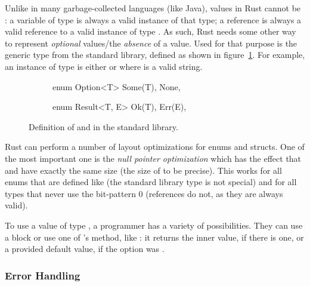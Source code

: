 Unlike in many garbage-collected languages (like Java), values in Rust cannot be :
a variable of type  is always a valid instance of that type; a reference  is always a valid reference to a valid instance of type .
As such, Rust needs some other way to represent \emph{optional} values/the \emph{absence} of a value.
Used for that purpose is the generic type  from the standard library, defined as shown in figure~\ref{fig:option-result-def}.
For example, an instance of type  is either  or  where  is a valid string.

\begin{figure}[b]
\centering
\begin{subfigure}{.4\textwidth}
\begin{rustcode}
enum Option<T> {
    Some(T),
    None,
}
\end{rustcode}
\end{subfigure}
\begin{subfigure}{.4\textwidth}
\begin{rustcode}
enum Result<T, E> {
    Ok(T),
    Err(E),
}
\end{rustcode}
\end{subfigure}
\caption{Definition of  and  in the standard library.}
\label{fig:option-result-def}
\end{figure}

Rust can perform a number of layout optimizations for enums and structs. One of the most important one is the \emph{null pointer optimization} which has the effect that  and  have exactly the same size (the size of  to be precise). This works for all enums that are defined like  (the standard library type is not special) and for all types that never use the bit-pattern 0 (references do not, as they are always valid).

To use a value of type , a programmer has a variety of possibilities. They can use a  block or use one of 's method, like : it returns the inner value, if there is one, or a provided default value, if the option was .

\subsubsection*{Error Handling}

